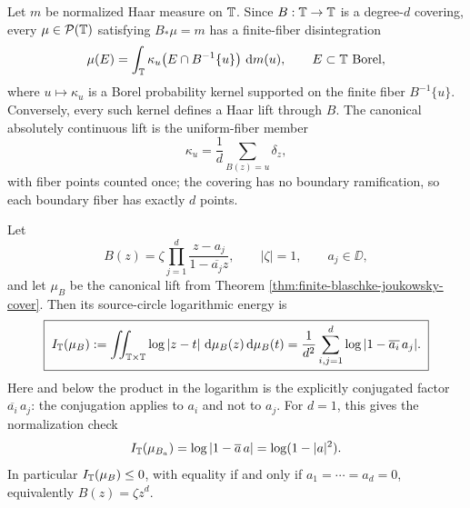 

\begin{remark}\label{rem:haar-lift-fiber-parametrization}
Let \(m\) be normalized Haar measure on \(\mathbb{T}\).  Since
\(B:\mathbb{T}\to\mathbb{T}\) is a degree-\(d\) covering, every
\(\mu\in\mathcal P(\mathbb{T})\) satisfying \(B_\ast\mu=m\) has a finite-fiber
disintegration
\[
\mu(E)=\int_{\mathbb{T}}\kappa_u\bigl(E\cap B^{-1}\{u\}\bigr)\,\,\mathrm{d} m(u),
\qquad E\subset\mathbb{T}\ \text{Borel},
\]
where \(u\mapsto\kappa_u\) is a Borel probability kernel supported on the
finite fiber \(B^{-1}\{u\}\).  Conversely, every such kernel defines a
Haar lift through \(B\).  The canonical absolutely continuous lift is the
uniform-fiber member
\[
\kappa_u=\frac1d\sum_{B(z)=u}\delta_z,
\]
with fiber points counted once; the covering has no boundary ramification,
so each boundary fiber has exactly \(d\) points.
\end{remark}

\begin{proposition}\label{prop:canonical-blaschke-lift-source-energy}
Let
\[
B(z)=\zeta\prod_{j=1}^{d}\frac{z-a_j}{1-\overline{a_j}z},
\qquad |\zeta|=1,
\qquad a_j\in\DD,
\]
and let \(\mu_B\) be the canonical lift from Theorem \ref{thm:finite-blaschke-joukowsky-cover}.  Then its source-circle logarithmic energy is
\[
\boxed{\;
I_{\mathbb{T}}(\mu_B):=\iint_{\mathbb{T}\times\mathbb{T}}\log|z-t|\,\,\mathrm{d}\mu_B(z)\,\mathrm{d}\mu_B(t)
=\frac1{d^2}\sum_{i,j=1}^{d}\log|1-\overline{a_i}\,a_j|.
\;}
\]
Here and below the product in the logarithm is the explicitly conjugated factor
\(\overline{a_i}\,a_j\): the conjugation applies to \(a_i\) and not to \(a_j\).
For \(d=1\), this gives the normalization check
\[
I_{\mathbb{T}}(\mu_{B_a})=\log|1-\overline a\,a|=\log(1-|a|^2).
\]
In particular \(I_{\mathbb{T}}(\mu_B)\le0\), with equality if and only if \(a_1=\cdots=a_d=0\), equivalently \(B(z)=\zeta z^d\).
\end{proposition}

